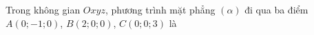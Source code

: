 \begin{ex}
Trong không gian $Oxyz$, phương trình mặt phẳng $(\alpha)$ đi qua ba điểm $A(0;-1;0)$, $B(2;0;0)$, $C(0;0;3)$ là
\end{ex}
